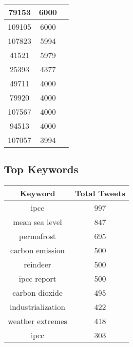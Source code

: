 \documentclass{article}\usepackage[T1]{fontenc}
\begin{document}
\begin{tabular}{|c|c|c|}
 \hline
79153 & 6000\\ 
 \hline
109105 & 6000\\ 
 \hline
107823 & 5994\\ 
 \hline
41521 & 5979\\ 
 \hline
25393 & 4377\\ 
 \hline
49711 & 4000\\ 
 \hline
79920 & 4000\\ 
 \hline
107567 & 4000\\ 
 \hline
94513 & 4000\\ 
 \hline
107057 & 3994\\ 
 \hline
\end{tabular}\subsection*{Top Keywords}\begin{tabular}{|c|c|}         \hline         Keyword & Total Tweets \\ 
 \hline
ipcc & 997\\ 
 \hline
mean sea level & 847\\ 
 \hline
permafrost & 695\\ 
 \hline
carbon emission & 500\\ 
 \hline
reindeer & 500\\ 
 \hline
ipcc report & 500\\ 
 \hline
carbon dioxide & 495\\ 
 \hline
industrialization & 422\\ 
 \hline
weather extremes & 418\\ 
 \hline
ipcc & 303\\ 
 \hline
\end{tabular}
\end{document}
